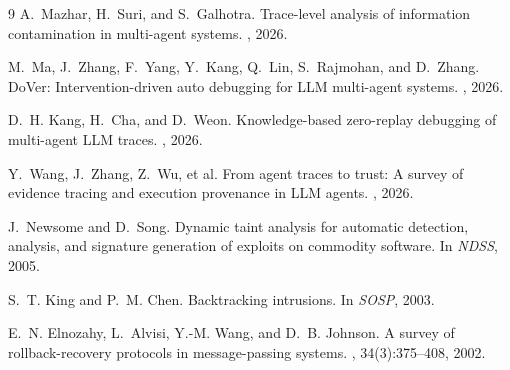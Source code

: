 \documentclass[10pt,twocolumn]{article}
\begin{document}
\begin{thebibliography}{9}
A.~Mazhar, H.~Suri, and S.~Galhotra.
\newblock Trace-level analysis of information contamination in multi-agent
systems.
, 2026.

M.~Ma, J.~Zhang, F.~Yang, Y.~Kang, Q.~Lin, S.~Rajmohan, and D.~Zhang.
\newblock DoVer: Intervention-driven auto debugging for LLM multi-agent
systems.
, 2026.

D.~H. Kang, H.~Cha, and D.~Weon.
\newblock Knowledge-based zero-replay debugging of multi-agent LLM traces.
, 2026.

Y.~Wang, J.~Zhang, Z.~Wu, et al.
\newblock From agent traces to trust: A survey of evidence tracing and
execution provenance in LLM agents.
, 2026.

J.~Newsome and D.~Song.
\newblock Dynamic taint analysis for automatic detection, analysis, and
signature generation of exploits on commodity software.
\newblock In {\em NDSS}, 2005.

S.~T. King and P.~M. Chen.
\newblock Backtracking intrusions.
\newblock In {\em SOSP}, 2003.

E.~N. Elnozahy, L.~Alvisi, Y.-M. Wang, and D.~B. Johnson.
\newblock A survey of rollback-recovery protocols in message-passing systems.
, 34(3):375--408, 2002.
\end{thebibliography}
\end{document}
